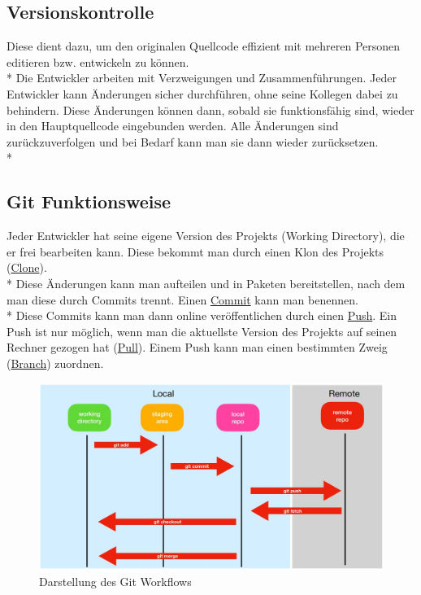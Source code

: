 \subsection{Versionskontrolle}
Diese dient dazu, um den originalen Quellcode effizient mit mehreren Personen editieren bzw. entwickeln zu können. 
\\* Die Entwickler arbeiten mit Verzweigungen und Zusammenführungen. Jeder Entwickler kann Änderungen sicher durchführen, ohne seine Kollegen dabei 
zu behindern. Diese Änderungen können dann, sobald sie funktionsfähig sind, wieder in den Hauptquellcode eingebunden werden.
Alle Änderungen sind zurückzuverfolgen und bei Bedarf kann man sie dann wieder zurücksetzen.
\cite{GitKinsta} \\*

\subsection{Git Funktionsweise}
Jeder Entwickler hat seine eigene Version des Projekts (Working Directory), die er frei bearbeiten kann. Diese bekommt man durch einen Klon des Projekts (\hyperref[sec:Clone]{Clone}). \\* Diese Änderungen kann man aufteilen und 
in Paketen bereitstellen, nach dem man diese durch Commits trennt. Einen \hyperref[sec:Commit]{Commit} kann man benennen. \\*
Diese Commits kann man dann online veröffentlichen durch einen \hyperref[sec:Push]{Push}. Ein Push ist nur möglich, wenn man die aktuellste Version des Projekts
auf seinen Rechner gezogen hat (\hyperref[sec:Pull]{Pull}). 
Einem Push kann man einen bestimmten Zweig (\hyperref[sec:Branch]{Branch}) zuordnen. 
\begin{figure}[htp]
    \author{David Ignjatovic}
    \centering
    \includegraphics[scale=0.35]{pics/GitWorkflow.jpg}
    \caption{Darstellung des Git Workflows}
    \label{fig:impl:GitWorkflow}
\end{figure}
